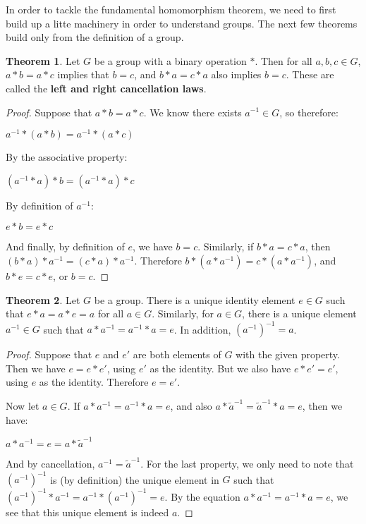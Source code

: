 \documentclass[12pt]{article}
\newcommand{\inv}[1]{#1^{-1}}
\theoremstyle{definition}
\newtheorem{theorem}{Theorem}[section]
\theoremstyle{definition}
\theoremstyle{definition}
\theoremstyle{definition}
\begin{document}
In order to tackle the fundamental homomorphism theorem, we need to first build up a litte machinery in order to understand groups. The next few theorems build only from the definition of a group.

\begin{theorem}
Let $G$ be a group with a binary operation $*$. Then for all $a, b, c \in G$, $a * b = a * c$ implies that $b = c$, and $b*a = c*a$ also implies $b=c$. These are called the \textbf{left and right cancellation laws}.
\end{theorem}

\begin{proof}
Suppose that $a*b = a*c$. We know there exists $\inv{a} \in G$, so therefore:

\begin{center}
    $\inv{a} * (a*b) = \inv{a} * (a*c)$
\end{center}

By the associative property:

\begin{center}
    $(\inv{a} * a) * b = (\inv{a} * a) * c$
\end{center}

By definition of $\inv{a}$:

\begin{center}
    $e * b = e * c$
\end{center}

And finally, by definition of $e$, we have $b = c$. Similarly, if $b*a = c*a$, then $(b*a)*\inv{a} = (c*a)*\inv{a}$. Therefore $b*(a*\inv{a}) = c*(a*\inv{a})$, and $b*e = c*e$, or $b = c$.

\end{proof}

\begin{theorem}
Let $G$ be a group. There is a unique identity element $e \in G$ such that $e*a = a*e = a$ for all $a \in G$. Similarly, for $a \in G$, there is a unique element $\inv{a} \in G$ such that $a*\inv{a} = \inv{a}*a = e$. In addition, $\left(\inv{a}\right)^{-1} = a$.
\end{theorem}

\begin{proof}
Suppose that $e$ and $e'$ are both elements of $G$ with the given property. Then we have $e = e*e'$, using $e'$ as the identity. But we also have $e*e' = e'$, using $e$ as the identity. Therefore $e = e'$.

Now let $a \in G$. If $a*\inv{a} = \inv{a}*a = e$, and also $a*\inv{\tilde{a}} = \inv{\tilde{a}}*a = e$, then we have:

\begin{center}
    $a*\inv{a} = e = a*{\inv{\tilde{a}}}$
\end{center}

And by cancellation, $\inv{a} = \inv{\tilde{a}}$. For the last property, we only need to note that $\left(\inv{a}\right)^{-1}$ is (by definition) the unique element in $G$ such that $\left(\inv{a}\right)^{-1} * \inv{a} = \inv{a} * \left(\inv{a}\right)^{-1} = e$. By the equation $a * \inv{a} = \inv{a} * a = e$, we see that this unique element is indeed $a$.

\end{proof}
\end{document}
